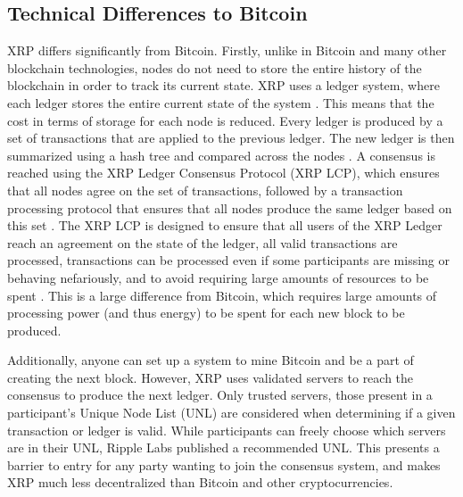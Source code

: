 \documentclass[11pt,a4paper]{article}
\begin{document}
	\subsection{Technical Differences to Bitcoin}
	
	XRP differs significantly from Bitcoin. Firstly, unlike in Bitcoin and many other blockchain technologies, nodes do not need to store the entire history of the blockchain in order to track its current state. XRP uses a ledger system, where each ledger stores the entire current state of the system \cite{rippledevelopers}. This means that the cost in terms of storage for each node is reduced. Every ledger is produced by a set of transactions that are applied to the previous ledger. The new ledger is then summarized using a hash tree and compared across the nodes \cite{bitcoinmagazine}. A consensus is reached using the XRP Ledger Consensus Protocol (XRP LCP), which ensures that all nodes agree on the set of transactions, followed by a transaction processing protocol that ensures that all nodes produce the same ledger based on this set \cite{Chase}. The XRP LCP is designed to ensure that all users of the XRP Ledger reach an agreement on the state of the ledger, all valid transactions are processed, transactions can be processed even if some participants are missing or behaving nefariously, and to avoid requiring large amounts of resources to be spent \cite{rippledevelopers}. This is a large difference from Bitcoin, which requires large amounts of processing power (and thus energy) to be spent for each new block to be produced.
	
	Additionally, anyone can set up a system to mine Bitcoin and be a part of creating the next block. However, XRP uses validated servers to reach the consensus to produce the next ledger. Only trusted servers, those present in a participant's Unique Node List (UNL) are considered when determining if a given transaction or ledger is valid. While participants can freely choose which servers are in their UNL, Ripple Labs published a recommended UNL. This presents a barrier to entry for any party wanting to join the consensus system, and makes XRP much less decentralized than Bitcoin and other cryptocurrencies.
	
\end{document}
